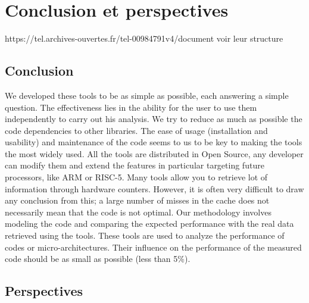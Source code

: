 \chapter{Conclusion et perspectives}
\label{chap:conclusion}
\minitoc

https://tel.archives-ouvertes.fr/tel-00984791v4/document
voir leur structure


\section{Conclusion}

    We developed these tools to be as simple as possible, each answering a simple question. The effectiveness lies in the ability for the user to use them independently to carry out his analysis. We try to reduce as much as possible the code dependencies to other libraries. The ease of usage (installation and usability) and maintenance of the code seems to us to be key to making the tools the most widely used. All the tools are distributed in Open Source, any developer can modify them and extend the features in particular targeting future processors, like ARM or RISC-5. Many tools allow you to retrieve lot of information through hardware counters. However, it is often very difficult to draw any conclusion from this; a large number of misses in the cache does not necessarily mean that the code is not optimal. Our methodology involves modeling the code and comparing the expected performance with the real data retrieved using the tools. 
    These tools are used to analyze the performance of codes or micro-architectures. Their influence on the performance of the measured code should be as small as possible (less than 5\%).


\section{Perspectives}



